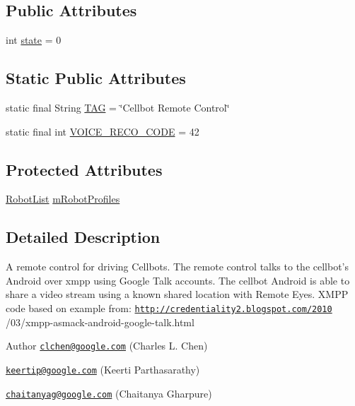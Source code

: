 \subsection*{Public Attributes}
\begin{DoxyCompactItemize}
\item 
int \hyperlink{classcom_1_1cellbots_1_1remote_1_1_cellbot_r_c_activity_a6977935c975ca9d83596806b2b3e474c}{state} = 0
\end{DoxyCompactItemize}
\subsection*{Static Public Attributes}
\begin{DoxyCompactItemize}
\item 
static final String \hyperlink{classcom_1_1cellbots_1_1remote_1_1_cellbot_r_c_activity_a4f41df11fc7e72266c02d4eab0eba2dd}{T\-A\-G} = \char`\"{}Cellbot Remote Control\char`\"{}
\item 
static final int \hyperlink{classcom_1_1cellbots_1_1remote_1_1_cellbot_r_c_activity_ac09782bdc4e6c867e06b09d79e1c9035}{V\-O\-I\-C\-E\-\_\-\-R\-E\-C\-O\-\_\-\-C\-O\-D\-E} = 42
\end{DoxyCompactItemize}
\subsection*{Protected Attributes}
\begin{DoxyCompactItemize}
\item 
\hyperlink{classcom_1_1cellbots_1_1_robot_list}{Robot\-List} \hyperlink{classcom_1_1cellbots_1_1remote_1_1_cellbot_r_c_activity_a58f38f2aab8f4cdcdd29809d6c9147c3}{m\-Robot\-Profiles}
\end{DoxyCompactItemize}


\subsection{Detailed Description}
A remote control for driving Cellbots. The remote control talks to the cellbot's Android over xmpp using Google Talk accounts. The cellbot Android is able to share a video stream using a known shared location with Remote Eyes. X\-M\-P\-P code based on example from\-: \href{http://credentiality2.blogspot.com/2010}{\tt http\-://credentiality2.\-blogspot.\-com/2010} /03/xmpp-\/asmack-\/android-\/google-\/talk.html

\begin{DoxyAuthor}{Author}
\href{mailto:clchen@google.com}{\tt clchen@google.\-com} (Charles L. Chen) 

\href{mailto:keertip@google.com}{\tt keertip@google.\-com} (Keerti Parthasarathy) 

\href{mailto:chaitanyag@google.com}{\tt chaitanyag@google.\-com} (Chaitanya Gharpure) 
\end{DoxyAuthor}


